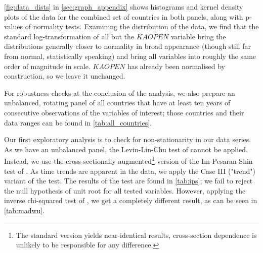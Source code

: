 \documentclass[12pt,a4paper]{article}
\begin{document}
\cref{fig:data_dists} in \cref{sec:graph_appendix} shows histograms and kernel density plots of the data for the combined set of countries in both panels, along with p-values of \cite{dagostinoTestsDepartureNormality1973} normality tests.
Examining the distribution of the data, we find that the standard log-transformation of all but the $KAOPEN$ variable bring the distributions generally closer to normality in broad appearance (though still far from normal, statistically speaking) and bring all variables into roughly the same order of magnitude in scale.
$KAOPEN$ has already been normalised by construction, so we leave it unchanged.

For robustness checks at the conclusion of the analysis, we also prepare an unbalanced, rotating panel of all countries that have at least ten years of consecutive observations of the variables of interest; those countries and their data ranges can be found in \cref{tab:all_countries}.

Our first exploratory analysis is to check for non-stationarity in our data series. 
As we have an unbalanced panel, the Levin-Lin-Chu test of \cite{levinUnitRootTests2002} cannot be applied.
Instead, we use the cross-sectionally augmented\footnote{The standard version yields near-identical results, cross-section dependence is unlikely to be responsible for any difference.} version of the Im-Pesaran-Shin test of \cite{pesaranSimplePanelUnit2007}.
As time trends are apparent in the data, we apply the Case III ("trend") variant of the test.
The results of the test are found in \cref{tab:ips}; we fail to reject the null hypothesis of unit root for all tested variables.
However, applying the inverse chi-squared test of \cite{maddalaComparativeStudyUnit1999}, we get a completely different result, as can be seen in \cref{tab:madwu}.
\end{document}
